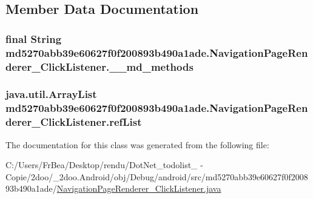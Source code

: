 \subsection{Member Data Documentation}
\hypertarget{classmd5270abb39e60627f0f200893b490a1ade_1_1_navigation_page_renderer___click_listener_3e5649188cf3a8722bdde6c7da3dc717}{
\subsubsection[{\_\-\_\-md\_\-methods}]{\setlength{\rightskip}{0pt plus 5cm}final String {\bf md5270abb39e60627f0f200893b490a1ade.NavigationPageRenderer\_\-ClickListener.\_\-\_\-md\_\-methods}}}
\label{classmd5270abb39e60627f0f200893b490a1ade_1_1_navigation_page_renderer___click_listener_3e5649188cf3a8722bdde6c7da3dc717}


\hypertarget{classmd5270abb39e60627f0f200893b490a1ade_1_1_navigation_page_renderer___click_listener_e4c5e1d7ccffa05c15b8ae87fdcccc50}{
\subsubsection[{refList}]{\setlength{\rightskip}{0pt plus 5cm}java.util.ArrayList {\bf md5270abb39e60627f0f200893b490a1ade.NavigationPageRenderer\_\-ClickListener.refList}}}
\label{classmd5270abb39e60627f0f200893b490a1ade_1_1_navigation_page_renderer___click_listener_e4c5e1d7ccffa05c15b8ae87fdcccc50}




The documentation for this class was generated from the following file:\begin{CompactItemize}
\item 
C:/Users/FrBea/Desktop/rendu/DotNet\_\-todolist\_ - Copie/2doo/\_\-2doo.Android/obj/Debug/android/src/md5270abb39e60627f0f200893b490a1ade/\hyperlink{_navigation_page_renderer___click_listener_8java}{NavigationPageRenderer\_\-ClickListener.java}\end{CompactItemize}
